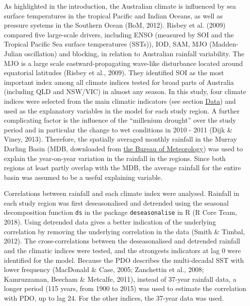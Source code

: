\documentclass[fleqn,10pt,lineno]{wlpeerj} %
\theoremstyle{definition}
\theoremstyle{definition}
\theoremstyle{definition}
\theoremstyle{remark}
\begin{document}
As highlighted in the introduction, the Australian climate is influenced
by sea surface temperatures in the tropical Pacific and Indian Oceans,
as well as pressure systems in the Southern Ocean (BoM, 2012). Risbey et
al. (2009) compared five large-scale drivers, including ENSO (measured
by SOI and the Tropical Pacific Sea surface temperatures (SSTs)), IOD,
SAM, MJO (Madden-Julian oscillation) and blocking, in relation to
Australian rainfall variability. The MJO is a large scale
eastward-propagating wave-like disturbance located around equatorial
latitudes (Risbey et al., 2009). They identified SOI as the most
important index among all climate indices tested for broad parts of
Australia (including QLD and NSW/VIC) in almost any season. In this
study, four climate indices were selected from the main climatic
indicators (see section \protect\hyperlink{Data}{Data}) and used as the
explanatory variables in the model for each study region. A further
complicating factor is the influence of the ``millenium drought'' over
the study period and in particular the change to wet conditions in 2010
- 2011 (Dijk \& Viney, 2013). Therefore, the spatially averaged monthly
rainfall in the Murray Darling Basin (MDB, downloaded from
\href{http://www.bom.gov.au/web01/ncc/www/cli_chg/timeseries/rain/allmonths/mdb/latest.txt}{the
Bureau of Meteorology}) was used to explain the year-on-year variation
in the rainfall in the regions. Since both regions at least partly
overlap with the MDB, the average rainfall for the entire basin was
assumed to be a useful explaining variable.

Correlations between rainfall and each climate index were analysed.
Rainfall in each study region was first deseasonalised and detrended
using the seasonal decomposition function \texttt{ds} in the package
\texttt{deseasonalise} in R (R Core Team, 2018). Using detrended data
gives a better indication of the underlying correlation by removing the
underlying correlation in the data (Smith \& Timbal, 2012). The
cross-correlations between the deseasonalised and detrended rainfall and
the climatic indices were tested, and the strongests indicators at lag 0
were identified for the model. Because the PDO describes the
multi-decadal SST with lower frequency (MacDonald \& Case, 2005;
Zanchettin et al., 2008; Kamruzzaman, Beecham \& Metcalfe, 2011),
instead of 37-year rainfall data, a longer period (115 years, from 1900
to 2015) was used to estimate the correlation with PDO, up to lag 24.
For the other indices, the 37-year data was used.
\end{document}
